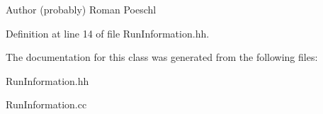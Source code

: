 \begin{DoxyAuthor}{Author}
(probably) Roman Poeschl 
\end{DoxyAuthor}


Definition at line 14 of file Run\-Information.\-hh.



The documentation for this class was generated from the following files\-:\begin{DoxyCompactItemize}
\item 
Run\-Information.\-hh\item 
Run\-Information.\-cc\end{DoxyCompactItemize}
